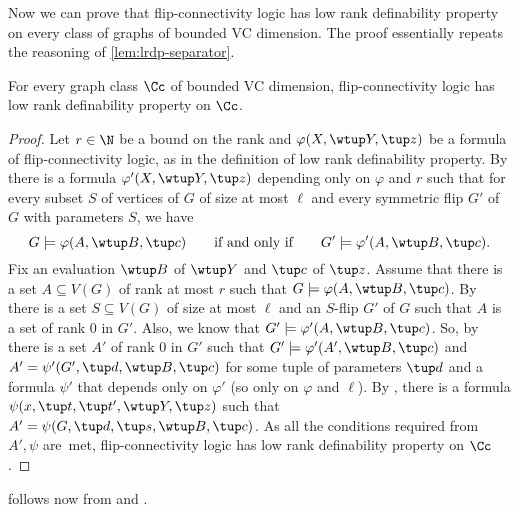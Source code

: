 Now we can prove that flip-connectivity logic has low rank definability property on every class of graphs of bounded VC dimension. The proof essentially repeats the reasoning of \cref{lem:lrdp-separator}.
\begin{lemma}
    \label{lem:property-for-fconn}
    For every graph class $\Cc$ of bounded VC dimension, flip-connectivity logic has low rank definability property on $\Cc$.
\end{lemma}
\begin{proof}
    Let $r \in \N$ be a bound on the rank and $\varphi(X, \wtup Y, \tup z)$ be a formula of flip-connectivity logic, as in the definition of low rank definability property.
    By  there is a formula $\varphi'(X, \wtup Y, \tup z)$ depending only on $\varphi$ and $r$ such that for every subset $S$ of vertices of $G$ of size at most $\ell$ and every symmetric flip $G'$ of $G$ with parameters $S$, we have
    \[
        G \models \varphi(A, \wtup B, \tup c)\qquad\textrm{if and only if}\qquad G' \models \varphi'(A, \wtup B, \tup c).
    \]
    Fix an evaluation $\wtup B$ of $\wtup Y$ and $\tup c$ of $\tup z$.
    Assume that there is a set $A \subseteq V(G)$ of rank at most $r$ such that $G \models \varphi(A, \wtup B, \tup c)$.
    By  there is a set $S \subseteq V(G)$ of size at most $\ell$ and an $S$-flip $G'$ of $G$ such that $A$ is a set of rank $0$ in $G'$.
    Also, we know that $G' \models \varphi'(A, \wtup B, \tup c)$.
    So, by  there is a set $A'$ of rank $0$ in $G'$ such that $G' \models \varphi'(A', \wtup B, \tup c)$ and $A' = \psi'(G', \tup d, \wtup B, \tup c)$ for some tuple of parameters $\tup d$ and a formula $\psi'$ that depends only on $\varphi'$ (so only on $\varphi$ and $\ell$).
    By , there is a formula $\psi(x, \tup t, \tup t', \wtup Y, \tup z)$ such that $A' = \psi(G, \tup d, \tup s, \wtup B, \tup c)$.
    As all the conditions required from $A', \psi$ are~met,  flip-connectivity logic has low rank definability property on $\Cc$.
\end{proof}

 follows now from  and .